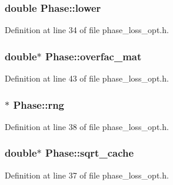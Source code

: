 \hypertarget{class_phase_a8b7dbdfafd0e3c84dba4138cace2e00b}{}
\subsubsection[{lower}]{\setlength{\rightskip}{0pt plus 5cm}double Phase\+::lower}\label{class_phase_a8b7dbdfafd0e3c84dba4138cace2e00b}


Definition at line 34 of file phase\+\_\+loss\+\_\+opt.\+h.

\hypertarget{class_phase_a76beec42b9bfdcd105edcb8505bab934}{}
\subsubsection[{overfac\+\_\+mat}]{\setlength{\rightskip}{0pt plus 5cm}double$\ast$ Phase\+::overfac\+\_\+mat}\label{class_phase_a76beec42b9bfdcd105edcb8505bab934}


Definition at line 43 of file phase\+\_\+loss\+\_\+opt.\+h.

\hypertarget{class_phase_abcd241887b2113672f6dc94877b79079}{}
\subsubsection[{rng}]{$\ast$ Phase\+::rng}\label{class_phase_abcd241887b2113672f6dc94877b79079}


Definition at line 38 of file phase\+\_\+loss\+\_\+opt.\+h.

\hypertarget{class_phase_a9508675d9cd23e96e4e5af0f3514d64e}{}
\subsubsection[{sqrt\+\_\+cache}]{\setlength{\rightskip}{0pt plus 5cm}double$\ast$ Phase\+::sqrt\+\_\+cache}\label{class_phase_a9508675d9cd23e96e4e5af0f3514d64e}


Definition at line 37 of file phase\+\_\+loss\+\_\+opt.\+h.

\hypertarget{class_phase_a64295bfa90607498ff8c544122afc3f9}{}
